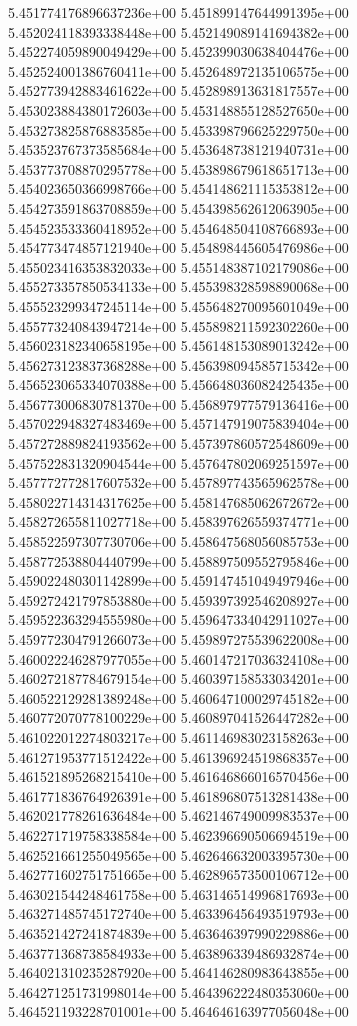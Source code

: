 5.451774176896637236e+00
5.451899147644991395e+00
5.452024118393338448e+00
5.452149089141694382e+00
5.452274059890049429e+00
5.452399030638404476e+00
5.452524001386760411e+00
5.452648972135106575e+00
5.452773942883461622e+00
5.452898913631817557e+00
5.453023884380172603e+00
5.453148855128527650e+00
5.453273825876883585e+00
5.453398796625229750e+00
5.453523767373585684e+00
5.453648738121940731e+00
5.453773708870295778e+00
5.453898679618651713e+00
5.454023650366998766e+00
5.454148621115353812e+00
5.454273591863708859e+00
5.454398562612063905e+00
5.454523533360418952e+00
5.454648504108766893e+00
5.454773474857121940e+00
5.454898445605476986e+00
5.455023416353832033e+00
5.455148387102179086e+00
5.455273357850534133e+00
5.455398328598890068e+00
5.455523299347245114e+00
5.455648270095601049e+00
5.455773240843947214e+00
5.455898211592302260e+00
5.456023182340658195e+00
5.456148153089013242e+00
5.456273123837368288e+00
5.456398094585715342e+00
5.456523065334070388e+00
5.456648036082425435e+00
5.456773006830781370e+00
5.456897977579136416e+00
5.457022948327483469e+00
5.457147919075839404e+00
5.457272889824193562e+00
5.457397860572548609e+00
5.457522831320904544e+00
5.457647802069251597e+00
5.457772772817607532e+00
5.457897743565962578e+00
5.458022714314317625e+00
5.458147685062672672e+00
5.458272655811027718e+00
5.458397626559374771e+00
5.458522597307730706e+00
5.458647568056085753e+00
5.458772538804440799e+00
5.458897509552795846e+00
5.459022480301142899e+00
5.459147451049497946e+00
5.459272421797853880e+00
5.459397392546208927e+00
5.459522363294555980e+00
5.459647334042911027e+00
5.459772304791266073e+00
5.459897275539622008e+00
5.460022246287977055e+00
5.460147217036324108e+00
5.460272187784679154e+00
5.460397158533034201e+00
5.460522129281389248e+00
5.460647100029745182e+00
5.460772070778100229e+00
5.460897041526447282e+00
5.461022012274803217e+00
5.461146983023158263e+00
5.461271953771512422e+00
5.461396924519868357e+00
5.461521895268215410e+00
5.461646866016570456e+00
5.461771836764926391e+00
5.461896807513281438e+00
5.462021778261636484e+00
5.462146749009983537e+00
5.462271719758338584e+00
5.462396690506694519e+00
5.462521661255049565e+00
5.462646632003395730e+00
5.462771602751751665e+00
5.462896573500106712e+00
5.463021544248461758e+00
5.463146514996817693e+00
5.463271485745172740e+00
5.463396456493519793e+00
5.463521427241874839e+00
5.463646397990229886e+00
5.463771368738584933e+00
5.463896339486932874e+00
5.464021310235287920e+00
5.464146280983643855e+00
5.464271251731998014e+00
5.464396222480353060e+00
5.464521193228701001e+00
5.464646163977056048e+00
